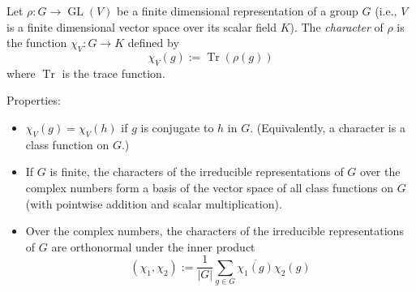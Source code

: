 \documentclass{article}
\begin{document}
Let $\rho: G \longrightarrow \operatorname{GL}(V)$ be a finite dimensional representation of a group $G$ (i.e., $V$ is a finite dimensional vector space over its scalar field $K$). The {\em character} of $\rho$ is the function $\chi_V: G \longrightarrow K$ defined by
$$
\chi_V(g) := \operatorname{Tr}(\rho(g))
$$
where $\operatorname{Tr}$ is the trace function.

Properties:
\begin{itemize}
\item $\chi_V(g) = \chi_V(h)$ if $g$ is conjugate to $h$ in $G$. (Equivalently, a character is a class function on $G$.)
\item If $G$ is finite, the characters of the irreducible representations of $G$ over the complex numbers form a basis of the vector space of all class functions on $G$ (with pointwise addition and scalar multiplication).
\item Over the complex numbers, the characters of the irreducible representations of $G$ are orthonormal under the inner product
$$
(\chi_1, \chi_2) := \frac{1}{|G|} \sum_{g \in G} \overline{\chi_1(g)} \chi_2(g)
$$
\end{itemize}
\end{document}
